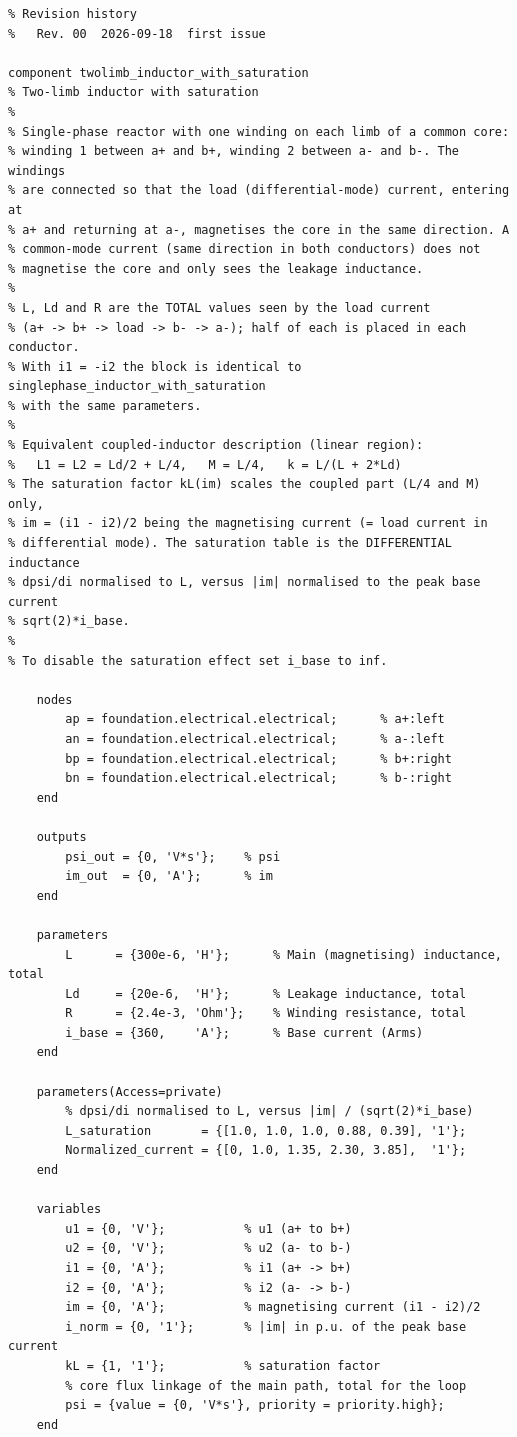 \documentclass[11pt,a4paper]{article}
\begin{document}
\begin{lstlisting}
% Revision history
%   Rev. 00  2026-09-18  first issue

component twolimb_inductor_with_saturation
% Two-limb inductor with saturation
%
% Single-phase reactor with one winding on each limb of a common core:
% winding 1 between a+ and b+, winding 2 between a- and b-. The windings
% are connected so that the load (differential-mode) current, entering at
% a+ and returning at a-, magnetises the core in the same direction. A
% common-mode current (same direction in both conductors) does not
% magnetise the core and only sees the leakage inductance.
%
% L, Ld and R are the TOTAL values seen by the load current
% (a+ -> b+ -> load -> b- -> a-); half of each is placed in each conductor.
% With i1 = -i2 the block is identical to singlephase_inductor_with_saturation
% with the same parameters.
%
% Equivalent coupled-inductor description (linear region):
%   L1 = L2 = Ld/2 + L/4,   M = L/4,   k = L/(L + 2*Ld)
% The saturation factor kL(im) scales the coupled part (L/4 and M) only,
% im = (i1 - i2)/2 being the magnetising current (= load current in
% differential mode). The saturation table is the DIFFERENTIAL inductance
% dpsi/di normalised to L, versus |im| normalised to the peak base current
% sqrt(2)*i_base.
%
% To disable the saturation effect set i_base to inf.

    nodes
        ap = foundation.electrical.electrical;      % a+:left
        an = foundation.electrical.electrical;      % a-:left
        bp = foundation.electrical.electrical;      % b+:right
        bn = foundation.electrical.electrical;      % b-:right
    end

    outputs
        psi_out = {0, 'V*s'};    % psi
        im_out  = {0, 'A'};      % im
    end

    parameters
        L      = {300e-6, 'H'};      % Main (magnetising) inductance, total
        Ld     = {20e-6,  'H'};      % Leakage inductance, total
        R      = {2.4e-3, 'Ohm'};    % Winding resistance, total
        i_base = {360,    'A'};      % Base current (Arms)
    end

    parameters(Access=private)
        % dpsi/di normalised to L, versus |im| / (sqrt(2)*i_base)
        L_saturation       = {[1.0, 1.0, 1.0, 0.88, 0.39], '1'};
        Normalized_current = {[0, 1.0, 1.35, 2.30, 3.85],  '1'};
    end

    variables
        u1 = {0, 'V'};           % u1 (a+ to b+)
        u2 = {0, 'V'};           % u2 (a- to b-)
        i1 = {0, 'A'};           % i1 (a+ -> b+)
        i2 = {0, 'A'};           % i2 (a- -> b-)
        im = {0, 'A'};           % magnetising current (i1 - i2)/2
        i_norm = {0, '1'};       % |im| in p.u. of the peak base current
        kL = {1, '1'};           % saturation factor
        % core flux linkage of the main path, total for the loop
        psi = {value = {0, 'V*s'}, priority = priority.high};
    end


\end{lstlisting}
\end{document}
